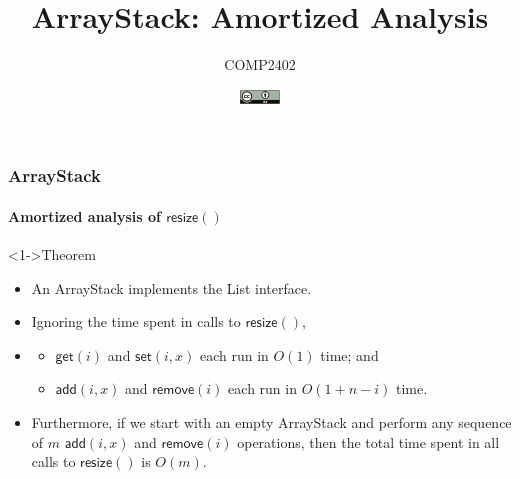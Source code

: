 \documentclass[aspectratio=169,xcolor=dvipsnames]{beamer}
\title{ArrayStack: Amortized Analysis}
\author{COMP2402}
\date{\includegraphics[height=1em]{by}}
\begin{document}
\begin{frame}
  \titlepage
\end{frame}

\begin{frame}
  \frametitle{ArrayStack}
  \framesubtitle{Amortized analysis of $\mathsf{resize}()$}
  \begin{block}<1->{Theorem}
    \begin{itemize}
      \item[]An ArrayStack implements the List interface.
      \item<1-| alert@2>[]Ignoring the time spent in calls to $\mathsf{resize}()$,
      \item[]
      \begin{itemize}
          \item$\mathsf{get}(i)$ and $\mathsf{set}(i,x)$ each run in $O(1)$ time; and
          \item$\mathsf{add}(i,x)$ and $\mathsf{remove}(i)$ each run in $O(1+n-i)$ time.
      \end{itemize}
      \item<3->[]Furthermore, if we start with an empty ArrayStack and perform any sequence of $m$ $\mathsf{add}(i,x)$ and $\mathsf{remove}(i)$ operations, then the total time spent in all calls to $\mathsf{resize}()$ is $O(m)$.
    \end{itemize}
  \end{block}
\end{frame}


\newlength{\nwidth}
\setlength{\fboxsep}{0pt}
\setlength{\nwidth}{.25\textwidth}
\end{document}
